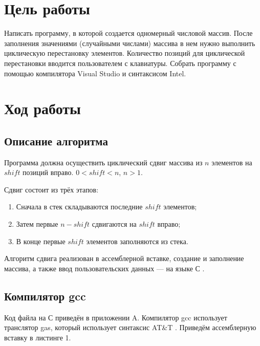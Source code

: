 \section{Цель работы}
Написать программу, в которой создается одномерный числовой массив. После заполнения значениями (случайными числами) массива в нем нужно выполнить циклическую перестановку элементов. Количество позиций для циклической перестановки вводится пользователем с клавиатуры.
Собрать программу с помощью компилятора Visual Studio и синтаксисом Intel.



\section{Ход работы}

\subsection{Описание алгоритма}

Программа должна осуществить циклический сдвиг массива из $n$ элементов на $shift$ позиций вправо. $0 < shift < n$, $n > 1$.

Сдвиг состоит из трёх этапов:
\begin{enumerate}
    \item Сначала в стек складываются последние $shift$ элементов;
    \item Затем первые $n - shift$ сдвигаются на $shift$ вправо;
    \item В конце первые $shift$ элементов заполняются из стека.
\end{enumerate}

Алгоритм сдвига реализован в ассемблерной вставке, создание и заполнение массива, а также ввод пользовательских данных — на языке С \cite{atnt2}.

\subsection{Компилятор gcc}

Код файла на С приведён в приложении A. Компилятор gcc использует транслятор gas, который использует синтаксис AT\&T \cite{atnt}. Приведём ассемблерную вставку в листинге 1.

